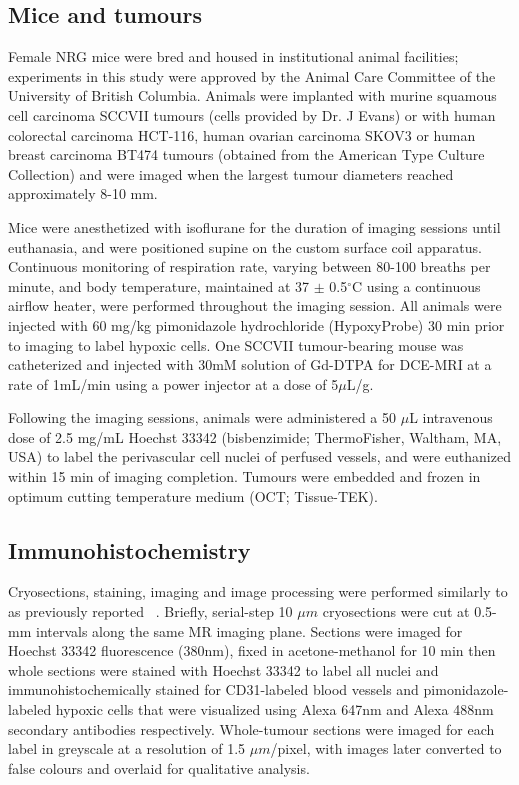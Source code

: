 \subsection{Mice and tumours}

Female NRG mice were bred and housed in institutional animal facilities; experiments in this study were approved by the Animal Care Committee of the University of British Columbia.
Animals were implanted with murine squamous cell carcinoma SCCVII tumours (cells provided by Dr. J Evans) or with human colorectal carcinoma HCT-116, human ovarian carcinoma SKOV3 or human breast carcinoma BT474 tumours (obtained from the American Type Culture Collection) and were imaged when the largest tumour diameters reached approximately 8-10 mm.

Mice were anesthetized with isoflurane for the duration of imaging sessions until euthanasia, and were positioned supine on the custom surface coil apparatus.
Continuous monitoring of respiration rate, varying between 80-100 breaths per minute, and body temperature, maintained at 37 $\pm$ 0.5$^\circ$C using a continuous airflow heater, were performed throughout the imaging session.
All animals were injected with 60 mg/kg pimonidazole hydrochloride (HypoxyProbe)  30 min prior to imaging to label hypoxic cells.
One SCCVII tumour-bearing mouse was catheterized and injected with 30mM solution of Gd-DTPA for DCE-MRI at a rate of 1mL/min using a power injector at a dose of 5$\mu$L/g.

Following the imaging sessions, animals were administered a 50 $\mu$L intravenous dose of 2.5 mg/mL Hoechst 33342 (bisbenzimide; ThermoFisher, Waltham, MA, USA) to label the perivascular cell nuclei of perfused vessels, and were euthanized within 15 min of imaging completion. 
Tumours were embedded and frozen in optimum cutting temperature medium (OCT; Tissue-TEK).

\subsection{Immunohistochemistry}

Cryosections, staining, imaging and image processing were performed similarly to as previously reported ~\cite{Baker:2015co}.
Briefly, serial-step 10 $\mu m$ cryosections were cut at 0.5-mm intervals along the same MR imaging plane.
Sections were imaged for Hoechst 33342 fluorescence (380nm), fixed in acetone-methanol for 10 min then whole sections were stained with Hoechst 33342 to label all nuclei and immunohistochemically stained for CD31-labeled blood vessels and pimonidazole-labeled hypoxic cells that were visualized using Alexa 647nm and Alexa 488nm secondary antibodies respectively.
Whole-tumour sections were imaged for each label in greyscale at a resolution of 1.5 $\mu m$/pixel, with images later converted to false colours and overlaid for qualitative analysis.

